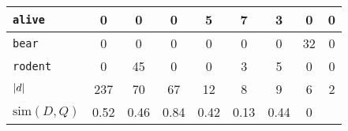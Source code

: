 \begin{table}[H]
\begin{tabular}{|l|c|c|c|c|c|c|c||c|}
                    \texttt{alive}  & \textcolor{irl}{0} & \textcolor{irl}{0} & \textcolor{irl}{0} &         5          &         7          &         3          & \textcolor{irl}{0} & 0 \\ \hline
                    \texttt{bear}   & \textcolor{irl}{0} & \textcolor{irl}{0} & \textcolor{irl}{0} & \textcolor{irl}{0} & \textcolor{irl}{0} & \textcolor{irl}{0} &         32          & 0\\ \hline
                    \texttt{rodent} & \textcolor{irl}{0} &         45         & \textcolor{irl}{0} & \textcolor{irl}{0} &         3          &         5          & \textcolor{irl}{0}  & 0\\ \hline\hline
                    \( \abs{d} \)   & 237                & 70                 & 67                 & 12                 & 8                  & 9                  & 6                & 2 \\ \hline
                    \( \text{sim}(D, Q) \) & 0.52 & 0.46 & 0.84 & 0.42 & 0.13 & 0.44 & 0 & \multicolumn{1}{c}{} \\ \cline{1-8}
                \end{tabular}
            \end{table}

